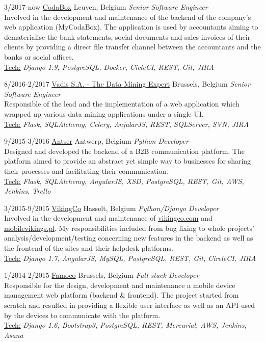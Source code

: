 \documentclass[]{friggeri-cv} %
\begin{document}
\begin{entrylist}

\entry
{3/2017-now}
{\href{http://www.codabox.com}{CodaBox}}
{Leuven, Belgium}
{\emph{Senior Software Engineer} \\
	Involved in the development and maintenance of the backend of the company's web application (MyCodaBox). The application is used by accountants aiming to dematerialise the bank statements, social documents and sales invoices of their clients by providing a direct file transfer channel between the accountants and the banks or social offices. \\
	\ul{Tech:} \emph{Django 1.9, PostgreSQL, Docker, CicleCI, REST, Git, JIRA}
}

\entry
{8/2016-2/2017}
{\href{http://www.vadis.com}{Vadis S.A. - The Data Mining Expert}}
{Brussels, Belgium}
{\emph{Senior Software Engineer} \\
Responsible of the lead and the implementation of a web application which wrapped up various data mining applications under a single UI.\\
\ul{Tech:} \emph{Flask, SQLAlchemy, Celery, AnjularJS, REST, SQLServer, SVN, JIRA}
}


\entry
{9/2015-3/2016}
{\href{http://antser.be}{Antser}}
{Antwerp, Belgium}
{\emph {Python Developer} \\
Designed and developed the backend of a B2B communication platform. The platform aimed to provide an abstract yet simple way to businesses for sharing their processes and facilitating their communication.\\
\ul{Tech:} \emph{Flask, SQLAlchemy, AngularJS, XSD, PostgreSQL, REST, Git, AWS, Jenkins, Trello}
}

\entry
{3/2015-9/2015}
{\href{http://vikingco.com}{VikingCo}}
{Hasselt, Belgium}
{\emph {Python/Django Developer} \\
Involved in the development and maintenance of \href{https://vikingco.com}{vikingco.com} and \href{https://mobilevikings.pl}{mobilevikings.pl}. My responsibilities included from bug fixing to whole projects' analysis/development/testing concerning new features in the backend as well as the frontend of the sites and their helpdesk platforms.\\
\ul{Tech:} \emph{Django 1.7, AngularJS, MySQL, PostgreSQL, REST, Git, CircleCI, JIRA}
}

\entry
{1/2014-2/2015}
{\href{http://famoco.com}{Famoco}}
{Brussels, Belgium}
{\emph {Full stack Developer} \\
Responsible for the design, development and maintenance a mobile device management web platform (backend \& frontend). The project started from scratch and resulted in providing a flexible user interface as well as an API used by the devices to communicate with the platform. \\
\ul{Tech:} \emph{Django 1.6, Bootstrap3, PostgreSQL, REST, Mercurial, AWS, Jenkins, Asana}
}


\end{entrylist}
\end{document}
